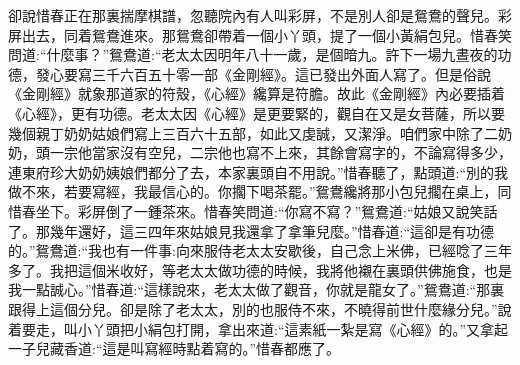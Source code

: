 


\begin{parag}
    卻說惜春正在那裏揣摩棋譜，忽聽院內有人叫彩屏，不是別人卻是鴛鴦的聲兒。彩屏出去，同着鴛鴦進來。那鴛鴦卻帶着一個小丫頭，提了一個小黃絹包兒。惜春笑問道:“什麼事？”鴛鴦道:“老太太因明年八十一歲，是個暗九。許下一場九晝夜的功德，發心要寫三千六百五十零一部《金剛經》。這已發出外面人寫了。但是俗說《金剛經》就象那道家的符殼，《心經》纔算是符膽。故此《金剛經》內必要插着《心經》，更有功德。老太太因《心經》是更要緊的，觀自在又是女菩薩，所以要幾個親丁奶奶姑娘們寫上三百六十五部，如此又虔誠，又潔淨。咱們家中除了二奶奶，頭一宗他當家沒有空兒，二宗他也寫不上來，其餘會寫字的，不論寫得多少，連東府珍大奶奶姨娘們都分了去，本家裏頭自不用說。”惜春聽了，點頭道:“別的我做不來，若要寫經，我最信心的。你擱下喝茶罷。”鴛鴦纔將那小包兒擱在桌上，同惜春坐下。彩屏倒了一鍾茶來。惜春笑問道:“你寫不寫？”鴛鴦道:“姑娘又說笑話了。那幾年還好，這三四年來姑娘見我還拿了拿筆兒麼。”惜春道:“這卻是有功德的。”鴛鴦道:“我也有一件事:向來服侍老太太安歇後，自己念上米佛，已經唸了三年多了。我把這個米收好，等老太太做功德的時候，我將他襯在裏頭供佛施食，也是我一點誠心。”惜春道:“這樣說來，老太太做了觀音，你就是龍女了。”鴛鴦道:“那裏跟得上這個分兒。卻是除了老太太，別的也服侍不來，不曉得前世什麼緣分兒。”說着要走，叫小丫頭把小絹包打開，拿出來道:“這素紙一紮是寫《心經》的。”又拿起一子兒藏香道:“這是叫寫經時點着寫的。”惜春都應了。
\end{parag}


